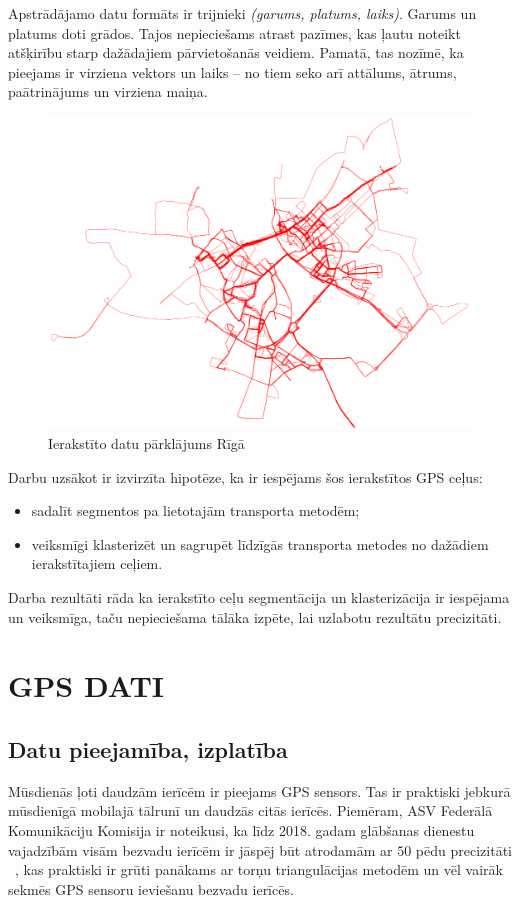 \documentclass{ludis}
\begin{document}
Apstrādājamo datu formāts ir trijnieki \emph{(garums, platums, laiks)}. Garums un platums doti 
grādos. Tajos nepieciešams atrast pazīmes, kas ļautu noteikt atšķirību starp dažādajiem 
pārvie\-tošanās veidiem. Pamatā, tas nozīmē, ka pieejams ir virziena vektors un laiks -- no tiem
seko arī attālums, ātrums, paātrinājums un virziena maiņa.

\begin{figure}
  \centering
  \includegraphics[scale=0.5]{img/all_trails}
  \caption{Ierakstīto datu pārklājums Rīgā}
  \label{fig:all_trails}
\end{figure}

Darbu uzsākot ir izvirzīta hipotēze, ka ir iespējams šos ierakstītos GPS ceļus:
\begin{itemize}
\item sadalīt segmentos pa lietotajām transporta metodēm;
\item veiksmīgi klasterizēt un sagrupēt līdzīgās transporta metodes no dažādiem ierakstītajiem ceļiem.
\end{itemize}


Darba rezultāti rāda ka ierakstīto ceļu segmentācija un klasterizācija ir iespējama un \linebreak 
veiksmīga, taču nepieciešama tālāka izpēte, lai uzlabotu rezultātu precizitāti.

\chapter{GPS DATI}
\section{Datu pieejamība, izplatība}
Mūsdienās ļoti daudzām ierīcēm ir pieejams GPS sensors. Tas ir praktiski jebkurā mūs\-dienīgā mobilajā
tālrunī un daudzās citās ierīcēs. Piemēram, ASV Federālā Komunikāciju \linebreak Komisija ir
noteikusi, ka līdz
2018. gadam glābšanas dienestu vajadzībām visām bezvadu ierīcēm ir jāspēj būt atrodamām 
ar $50$ pēdu precizitāti ~\cite{fcc_e911}, kas praktiski ir grūti panākams ar torņu triangulācijas 
metodēm un vēl vairāk sekmēs GPS sensoru ieviešanu bezvadu ierīcēs.
\end{document}
